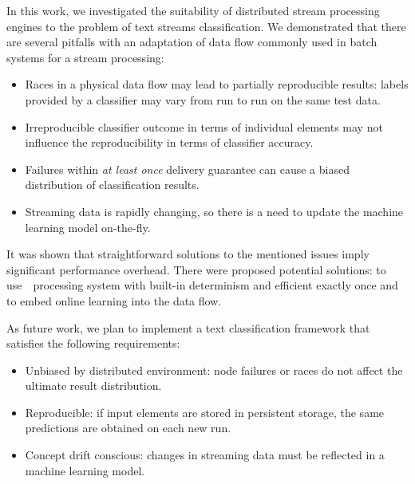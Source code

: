 \label {fs-conclusion}

In this work, we investigated the suitability of distributed stream processing engines to the problem of text streams classification. We demonstrated that there are several pitfalls with an adaptation of data flow commonly used in batch systems for a stream processing:

\begin{itemize}
    \item Races in a physical data flow may lead to partially reproducible results: labels provided by a classifier may vary from run to run on the same test data.
    \item Irreproducible classifier outcome in terms of individual elements may not influence the reproducibility in terms of classifier accuracy. 
    \item Failures within {\em at least once} delivery guarantee can cause a biased distribution of classification results.
    \item Streaming data is rapidly changing, so there is a need to update the machine learning model on-the-fly. 
\end{itemize}

It was shown that straightforward solutions to the mentioned issues imply significant performance overhead. There were proposed potential solutions: to use~\FlameStream\ processing system with built-in determinism and efficient exactly once and to embed online learning into the data flow. 

As future work, we plan to implement a text classification framework that satisfies the following requirements:

\begin{itemize}
    \item Unbiased by distributed environment: node failures or races do not affect the ultimate result distribution.
    \item Reproducible: if input elements are stored in persistent storage, the same predictions are obtained on each new run.
    \item Concept drift conscious: changes in streaming data must be reflected in a machine learning model.  
\end{itemize}